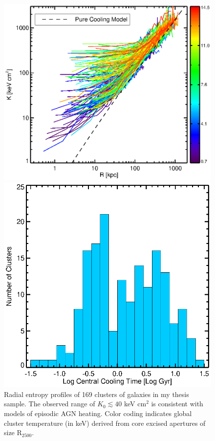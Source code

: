 \documentclass[11pt]{article}
\begin{document}
\clearpage
\begin{figure}[t]
    \begin{minipage}[t]{0.5\linewidth}
        \centering
        \includegraphics*[width=\textwidth, trim=28mm 8mm 30mm 10mm, clip]{splots}
        \caption{\small Radial entropy profiles of 169 clusters of
        galaxies in my thesis sample. The observed range of $K_0 \lesssim
        40$ keV cm$^2$ is consistent with models of episodic AGN
        heating. Color coding indicates global cluster temperature (in keV)
        derived from core excised apertures of size R$_{2500}$.}
        \label{fig:splots}
    \end{minipage}
    \hspace{0.1in}
    \begin{minipage}[t]{0.5\linewidth}
        \centering
        \includegraphics*[width=\textwidth, trim=28mm 8mm 30mm 10mm, clip]{tcool}

\end{minipage}
\end{figure}
\end{document}
